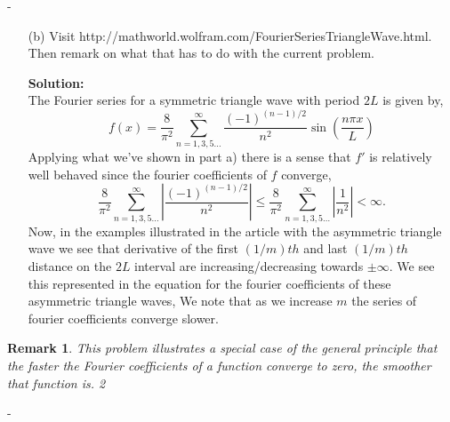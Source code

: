 \documentclass[12pt]{article}
\makeatletter
\newtheorem*{remark}{Remark}
\theoremstyle{ex215}
\newcounter{probcount}
\newlength\probsep
\newlength\pshrinking
\newenvironment{problems}%
  {\ifhmode\unskip\par\fi\setcounter{probcount}{0}\probsep\parskip
  \sbox\@tempboxa{\textbf{9.}}\pshrinking\wd\@tempboxa\advance\pshrinking\labelsep
  \advance\linewidth -\pshrinking
  \advance\@totalleftmargin\pshrinking
  \advance\leftskip\pshrinking}%
  {\ifhmode\unskip \par\fi\advance\leftskip-\pshrinking}%
\newcommand{\localhead}[1]{\par\smallskip\textbf{#1}\nobreak\\}%
\newcommand\solution{\localhead{Solution:}}
\newcommand{\abs}[1]{\left| #1 \right|}
\makeatother
\begin{document}
\begin{problems}
\begin{enumerate}
  \item[(b)] Visit http://mathworld.wolfram.com/FourierSeriesTriangleWave.html.
  Then remark on what that has to do with the current problem.
  \solution The Fourier series for a symmetric triangle wave with period $2L$ is given by,
  \begin{equation*}
    f(x) = \dfrac{8}{\pi^2}
    \sum_{n = 1, 3, 5\dots}^\infty \dfrac{(-1)^{(n - 1)/2}}{n^2} \sin\left(\dfrac{n\pi x}{L}\right)
  \end{equation*}
  Applying what we've shown in part a) there is a sense that $f'$ is relatively well behaved since the fourier coefficients of $f$ converge, 
  \begin{equation*}
    \dfrac{8}{\pi^2}\sum_{n = 1, 3, 5\dots}^\infty \abs{\dfrac{(-1)^{(n - 1)/2}}{n^2}} \leq \dfrac{8}{\pi^2}\sum_{n = 1, 3, 5\dots}^\infty \abs{\dfrac{1}{n^2}} < \infty. 
  \end{equation*}
  Now, in the examples illustrated in the article with the asymmetric triangle wave we see that derivative of the first $(1/m)th$ and last $(1/m)th$ distance on the $2L$ interval are increasing/decreasing towards $\pm \infty$. We see this represented in the equation for the fourier coefficients of these asymmetric triangle waves, 
  We note that as we increase $m$ the series of fourier coefficients converge slower. 
  

\end{enumerate}

\begin{remark}
This problem illustrates a special case of the general principle that the faster the
Fourier coefficients of a function converge to zero, the smoother that function is.
2
\end{remark}



\end{problems}
\end{document}
